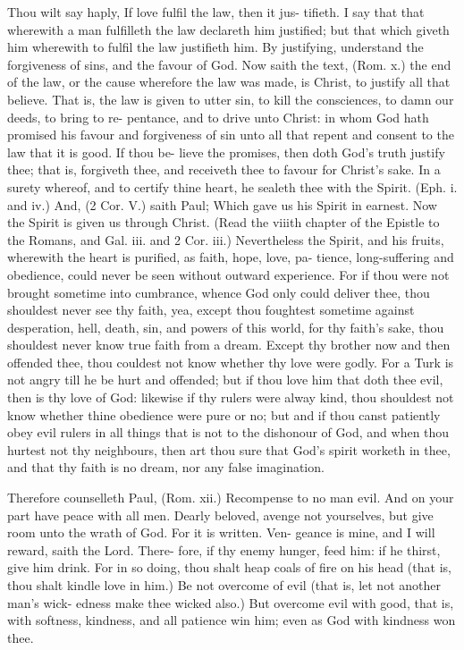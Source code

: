 \documentclass{custom}
\begin{document}
Thou wilt say haply, If love fulfil the law, then it jus- 
tifieth. I say that that wherewith a man fulfilleth the 
law declareth him justified; but that which giveth him 
wherewith to fulfil the law justifieth him. By justifying, 
understand the forgiveness of sins, and the favour of God.
Now saith the text, (Rom. x.) the end of the law, or the 
cause wherefore the law was made, is Christ, to justify 
all that believe. That is, the law is given to utter sin, to 
kill the consciences, to damn our deeds, to bring to re- 
pentance, and to drive unto Christ: in whom God hath 
promised his favour and forgiveness of sin unto all that 
repent and consent to the law that it is good. If thou be- 
lieve the promises, then doth God's truth justify thee;
that is, forgiveth thee, and receiveth thee to favour for 
Christ's sake. In a surety whereof, and to certify thine 
heart, he sealeth thee with the Spirit. (Eph. i. and iv.) And, 
(2 Cor. V.) saith Paul; Which gave us his Spirit in earnest. 
Now the Spirit is given us through Christ. (Read the 
viiith chapter of the Epistle to the Romans, and Gal. iii. 
and 2 Cor. iii.) Nevertheless the Spirit, and his fruits, 
wherewith the heart is purified, as faith, hope, love, pa- 
tience, long-suffering and obedience, could never be 
seen without outward experience. For if thou were not 
brought sometime into cumbrance, whence God only 
could deliver thee, thou shouldest never see thy faith, yea, 
except thou foughtest sometime against desperation, hell, 
death, sin, and powers of this world, for thy faith's 
sake, thou shouldest never know true faith from a 
dream. Except thy brother now and then offended thee, 
thou couldest not know whether thy love were godly. 
For a Turk is not angry till he be hurt and offended;
but if thou love him that doth thee evil, then is thy 
love of God: likewise if thy rulers were alway kind, thou 
shouldest not know whether thine obedience were pure 
or no; but and if thou canst patiently obey evil rulers in 
all things that is not to the dishonour of God, and when 
thou hurtest not thy neighbours, then art thou sure that 
God's spirit worketh in thee, and that thy faith is no dream, 
nor any false imagination. 

Therefore counselleth Paul, (Rom. xii.) Recompense 
to no man evil. And on your part have peace with all 
men. Dearly beloved, avenge not yourselves, but give 
room unto the wrath of God. For it is written. Ven- 
geance is mine, and I will reward, saith the Lord. There- 
fore, if thy enemy hunger, feed him: if he thirst, give 
him drink. For in so doing, thou shalt heap coals of fire 
on his head (that is, thou shalt kindle love in him.) Be 
not overcome of evil (that is, let not another man's wick- 
edness make thee wicked also.) But overcome evil with 
good, that is, with softness, kindness, and all patience 
win him; even as God with kindness won thee.
\end{document}
